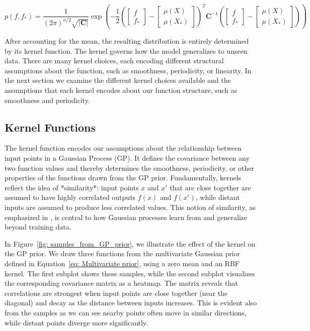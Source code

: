 \documentclass{article}
\begin{document}
\begin{equation}
    p(f, f_*) = \frac{1}{(2\pi)^{n/2} \sqrt{|\mathbf{C}|}} \exp\left( 
    - \frac{1}{2}\left(\begin{bmatrix}f \\f_*\end{bmatrix}-
    \begin{bmatrix}\mu(X) \\\mu(X_*)\end{bmatrix}\right)^T
    \mathbf{C}^{-1}\left(
    \begin{bmatrix}f \\f_*\end{bmatrix}-
    \begin{bmatrix}\mu(X) \\\mu(X_*)\end{bmatrix}\right)\right)
\end{equation}
    

\noindent
After accounting for the mean, the resulting distribution is entirely determined by its kernel function.
The kernel governs how the model generalizes to unseen data. There are many kernel choices, each encoding different structural assumptions about the function, such as smoothness, periodicity, or linearity.
In the next section we examine the different kernel choices available and the assumptions that each kernel encodes about our function structure, such as smoothness and periodicity.



\subsection{Kernel Functions}
\label{sec: Kernels}
The kernel function encodes our assumptions about the relationship between input points in a Gaussian Process (GP).
It defines the covariance between any two function values and thereby determines the smoothness, periodicity, or other properties of the functions drawn from the GP prior.
Fundamentally, kernels reflect the idea of *similarity*: input points \( x \) and \( x' \) that are close together are assumed to have highly correlated outputs \( f(x) \) and \( f(x') \),
while distant inputs are assumed to produce less correlated values. This notion of similarity, as emphasized in \cite[p.~79]{bible}, is central to how Gaussian processes learn from and generalize beyond training data.

\vspace{1em}
\noindent
In Figure~\ref{fig: samples_from_GP_prior}, we illustrate the effect of the kernel on the GP prior.
We draw three functions from the multivariate Gaussian prior defined in Equation~\ref{eq: Multivariate prior}, using a zero mean and an RBF kernel.
The first subplot shows these samples, while the second subplot visualizes the corresponding covariance matrix as a heatmap.
The matrix reveals that correlations are strongest when input points are close together (near the diagonal) and decay as the distance between inputs increases.
This is evident also from the samples as we can see nearby points often move in similar directions, while distant points diverge more significantly.
\end{document}

